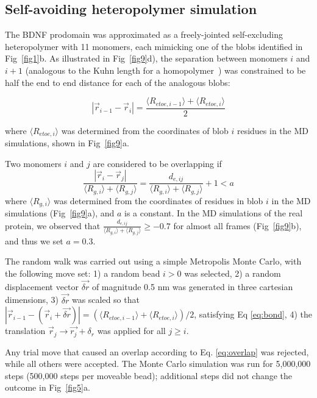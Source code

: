 \documentclass[10pt,letterpaper]{article}
\begin{document}
\subsection*{Self-avoiding heteropolymer simulation} 
The BDNF prodomain was approximated as a freely-jointed self-excluding heteropolymer with 11 monomers, each mimicking one of the blobs identified in Fig~\ref{fig1}b. As illustrated in Fig~\ref{fig9}d), the separation between monomers $i$ and $i+1$ (analogous to the Kuhn length for a homopolymer~\cite{Rubinstein2003}) was constrained to be half the end to end distance for each of the analogous blobs:

\begin{equation}|\vec{r}_{i-1} - \vec{r}_i| = \frac{\langle R_{etoe,i-1}\rangle + \langle R_{etoe,i}\rangle }{2}\label{eq:bond}\end{equation}

where $\langle R_{etoe,i}\rangle$ was determined from the coordinates of blob $i$ residues in the MD simulations, shown in Fig~\ref{fig9}a.

Two monomers $i$ and $j$ are considered to be overlapping if \begin{equation}\frac{|\vec{r}_i- \vec{r}_j|}{\langle R_{g, i}\rangle + \langle R_{g, j}\rangle} = \frac{d_{e,ij}}{\langle R_{g, i}\rangle + \langle R_{g, j}\rangle} +1 < a \label{eq:overlap}\end{equation} where $\langle R_{g, i}\rangle$ was determined from the coordinates of residues in blob $i$ in the MD simulations (Fig~\ref{fig9}a), and $a$ is a constant. In the MD simulations of the real protein, we observed that $\frac{d_{e,ij}}{\langle R_{g, i}\rangle + \langle R_{g, j}\rangle} \ge -0.7$ for almost all frames (Fig~\ref{fig9}b), and thus we set $a =0.3$. 

The random walk was carried out using a simple Metropolis Monte Carlo, with the following move set: 1) a random bead $i>0$ was selected, 2) a random displacement vector $\vec{\delta r}$ of magnitude 0.5 nm was generated in three cartesian dimensions, 3) $\vec{\delta r}$ was scaled so that $|\vec{r}_{i-1} - (\vec{r}_i + \vec{\delta r})| =( \langle R_{etoe,i-1}\rangle + \langle R_{etoe,i}\rangle)/2$, satisfying Eq \ref{eq:bond}, 4) the translation $\vec{r}_j \rightarrow \vec{r_j} + \delta_r$ was applied for all $j\ge i$.

Any trial move that caused an overlap according to Eq. \ref{eq:overlap} was rejected, while all others were accepted. The Monte Carlo simulation was run for 5,000,000 steps (500,000 steps per moveable bead); additional steps did not change the outcome in Fig~\ref{fig5}a.
\end{document}
